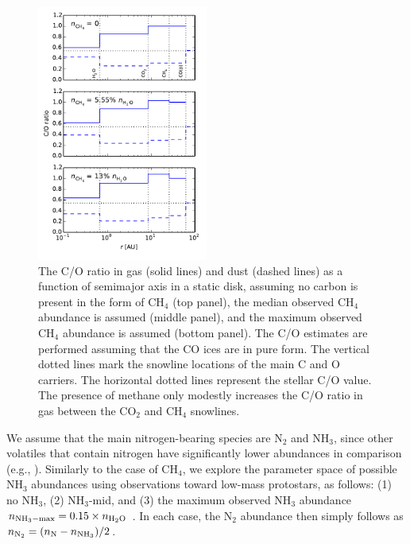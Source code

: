 \documentclass[apj]{emulateapj}
\begin{document}
\begin{figure}[h!]
\centering
\includegraphics[width=0.5\textwidth]{C_O_ratio_CH4.pdf}
\caption{The C/O ratio in gas (solid lines) and dust (dashed lines) as a function of semimajor axis in a static disk, assuming no carbon is present in the form of CH$_4$ (top panel), the median observed CH$_4$ abundance is assumed (middle panel), and the maximum observed CH$_4$ abundance is assumed (bottom panel). The C/O estimates are performed assuming that the CO ices are in pure form. The vertical dotted lines mark the snowline locations of the main C and O carriers. The horizontal dotted lines represent the stellar C/O value. The presence of methane only modestly increases the C/O ratio in gas between the CO$_2$ and CH$_4$ snowlines.} 
\label{fig:COstatic}
\end{figure}

We assume that the main nitrogen-bearing species are N$_2$ and NH$_3$, since other volatiles that contain nitrogen have significantly lower abundances in comparison (e.g., \citealt{mumma11}). Similarly to the case of CH$_4$, we explore the parameter space of possible NH$_3$ abundances using observations toward low-mass protostars, as follows: (1) no NH$_3$, (2) NH$_3$-mid, and (3) the maximum observed NH$_3$ abundance $n_{\rm NH_3-max}=0.15 \times n_{\rm H_2O}$ \citep{bottinelli10}. In each case, the N$_2$ abundance then simply follows as $n_{\rm N_2}=(n_{\rm N}-n_{\rm NH_3})/2$. 
\end{document}
